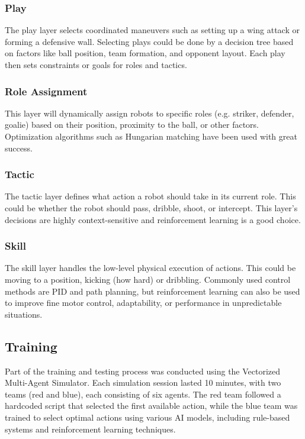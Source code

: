\subsubsection{Play}
The play layer selects coordinated maneuvers such as setting up a wing attack or forming a defensive wall. Selecting plays could be done by a decision tree based on factors like ball position, team formation, and opponent layout. Each play then sets constraints or goals for roles and tactics.

\subsubsection{Role Assignment}
This layer will dynamically assign robots to specific roles (e.g. striker, defender, goalie) based on their position, proximity to the ball, or other factors.
Optimization algorithms such as Hungarian matching have been used with great success.

\subsubsection{Tactic}
The tactic layer defines what action a robot should take in its current role.
This could be whether the robot should pass, dribble, shoot, or intercept.
This layer's decisions are highly context-sensitive and reinforcement learning is a good choice.

\subsubsection{Skill}
The skill layer handles the low-level physical execution of actions.
This could be moving to a position, kicking (how hard) or dribbling. Commonly used control methods are PID and path planning, but reinforcement learning can also be used to improve fine motor control, adaptability, or performance in unpredictable situations.

\subsection{Training}
Part of the training and testing process was conducted using the Vectorized Multi-Agent Simulator. Each simulation session lasted 10 minutes, with two teams (red and blue), each consisting of six agents. The red team followed a hardcoded script that selected the first available action, while the blue team was trained to select optimal actions using various AI models, including rule-based systems and reinforcement learning techniques.

